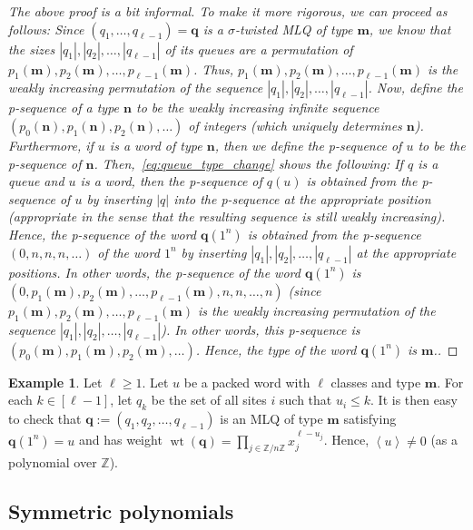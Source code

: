 \documentclass[reqno]{amsart}
\newcommand{\0}{\phantom{c}}
\newcommand{\swt}[1]{\left\langle #1 \right\rangle} %
\DeclareMathOperator{\wt}{wt} %
\newcommand{\mm}{\mathbf{m}}
\newcommand{\nn}{\mathbf{n}}
\newcommand{\qq}{\mathbf{q}}
\newcommand{\ZZ}{\mathbb{Z}}
\let\prodnonlimits\prod
\renewcommand{\prod}{\prodnonlimits\limits}
\newenvironment{verlong}{}{}
\newcommand{\abs}[1]{\left| #1 \right|}
\newcommand{\tup}[1]{\left( #1 \right)}
\newcommand{\ive}[1]{\left[ #1 \right]}
\newcommand{\defn}[1]{{\color{darkred}\emph{#1}}} %
\theoremstyle{plain}
\theoremstyle{definition}
\newtheorem{example}[thm]{Example}
\numberwithin{equation}{section}
\begin{document}
\begin{verlong}
\begin{proof}
[The above proof is a bit informal.
To make it more rigorous, we can proceed as follows: Since $\tup{q_1, \ldots, q_{\ell-1}} = \qq$ is a $\sigma$-twisted MLQ of type $\mm$, we know that the sizes $\abs{q_1}, \abs{q_2}, \ldots, \abs{q_{\ell-1}}$ of its queues are a permutation of $p_1(\mm), p_2(\mm), \ldots, p_{\ell-1}(\mm)$.
Thus, $p_1(\mm), p_2(\mm), \ldots, p_{\ell-1}(\mm)$ is the weakly increasing permutation of the sequence $\abs{q_1}, \abs{q_2}, \ldots, \abs{q_{\ell-1}}$.
Now, define the \defn{p-sequence} of a type $\nn$ to be the weakly increasing infinite sequence $\tup{p_0(\nn), p_1(\nn), p_2(\nn), \ldots}$ of integers (which uniquely determines $\nn$).
Furthermore, if $u$ is a word of type $\nn$, then we define the p-sequence of $u$ to be the p-sequence of $\nn$.
Then,~\eqref{eq:queue_type_change} shows the following: If $q$ is a queue and $u$ is a word, then the p-sequence of $q(u)$ is obtained from the p-sequence of $u$ by inserting $\abs{q}$ into the p-sequence at the appropriate position (appropriate in the sense that the resulting sequence is still weakly increasing).
Hence, the p-sequence of the word $\qq (1^n)$ is obtained from the p-sequence $\tup{0, n, n, n, \ldots}$ of the word $1^n$ by inserting $\abs{q_1}, \abs{q_2}, \ldots, \abs{q_{\ell-1}}$ at the appropriate positions.
In other words, the p-sequence of the word $\qq (1^n)$ is $\tup{0, p_1(\mm), p_2(\mm), \ldots, p_{\ell-1}(\mm), n, n, \ldots, n}$ (since $p_1(\mm), p_2(\mm), \ldots, p_{\ell-1}(\mm)$ is the weakly increasing permutation of the sequence $\abs{q_1}, \abs{q_2}, \ldots, \abs{q_{\ell-1}}$).
In other words, this p-sequence is $\tup{p_0(\mm), p_1(\mm), p_2(\mm), \ldots}$.
Hence, the type of the word $\qq (1^n)$ is $\mm$.]
\end{proof}
\end{verlong}

\begin{example}
Let $\ell \geq 1$.
Let $u$ be a packed word with $\ell$ classes and type $\mm$.
For each $k \in \ive{\ell-1}$, let $q_k$ be the set of all sites $i$ such that $u_i \leq k$.
It is then easy to check that $\qq := \tup{q_1, q_2, \ldots, q_{\ell-1}}$ is an
MLQ of type $\mm$ satisfying $\qq(1^n) = u$ and has weight
$\wt(\qq) = \prod_{j \in \ZZ / n \ZZ} x_j^{\ell - u_j}$.
Hence, $\swt{u} \neq 0$ (as a polynomial over $\ZZ$).
\end{example}




\subsection{Symmetric polynomials}
\end{document}
